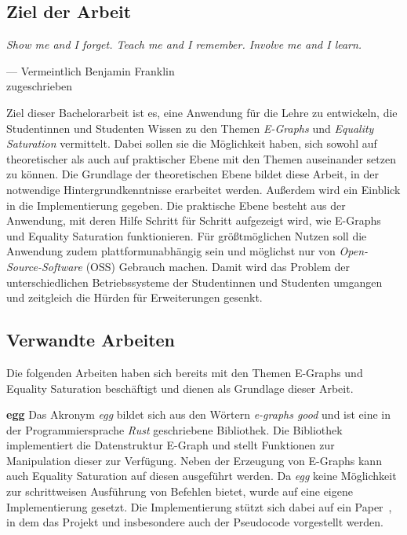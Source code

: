 \subsection{Ziel der Arbeit}

\vspace{5mm}
\begin{center}
    {\itshape
    \rmfamily
    \glqq Show me and I forget.
    Teach me and I remember. 
    Involve me and I learn.\grqq}
    \vspace{-3mm}
    \begin{flushright}
        \footnotesize
        --- Vermeintlich 
        Benjamin Franklin \\
        zugeschrieben~\cite{franklin}
    \end{flushright}
\end{center}\vspace{3mm}

Ziel dieser Bachelorarbeit ist es, eine Anwendung für die Lehre zu entwickeln, die Studentinnen und Studenten Wissen zu den Themen \textit{E-Graphs} und \textit{Equality Saturation}
vermittelt. Dabei sollen sie die Möglichkeit haben, sich sowohl auf theoretischer als auch auf praktischer Ebene mit den Themen auseinander setzen zu können.
Die Grundlage der theoretischen Ebene bildet diese Arbeit, in der notwendige Hintergrundkenntnisse erarbeitet werden. Außerdem wird ein Einblick in die Implementierung gegeben. 
Die praktische Ebene besteht aus der Anwendung, mit deren Hilfe Schritt für Schritt aufgezeigt wird, wie E-Graphs und Equality Saturation funktionieren.
Für grö{\ss}tmöglichen Nutzen soll die Anwendung zudem plattformunabhängig sein und möglichst nur von \textit{Open-Source-Software} (OSS) Gebrauch machen.
Damit wird das Problem der unterschiedlichen Betriebssysteme der Studentinnen und Studenten umgangen und zeitgleich die Hürden für Erweiterungen gesenkt.

\subsection{Verwandte Arbeiten}\label{sub:verwandtearbeiten}

Die folgenden Arbeiten haben sich bereits mit den Themen E-Graphs und Equality Saturation beschäftigt und dienen als Grundlage dieser Arbeit.

\noindent\textbf{egg} Das Akronym \textit{egg} bildet sich aus den Wörtern \textit{e-graphs good} und ist eine in der Programmiersprache \textit{Rust} geschriebene Bibliothek.
Die Bibliothek implementiert die Datenstruktur E-Graph und stellt Funktionen zur Manipulation dieser zur Verfügung.
Neben der Erzeugung von E-Graphs kann auch Equality Saturation auf diesen ausgeführt werden.
Da \textit{egg} keine Möglichkeit zur schrittweisen Ausführung von Befehlen bietet, wurde auf eine eigene Implementierung gesetzt. Die Implementierung stützt sich dabei auf ein Paper~\cite{2021-egg}, in dem 
das Projekt und insbesondere auch der Pseudocode vorgestellt werden.

